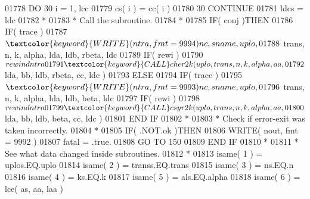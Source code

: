 \begin{DoxyCode}
01778                         \textcolor{keywordflow}{DO} 30 i = 1, lcc
01779                            cs( i ) = cc( i )
01780    30                   \textcolor{keywordflow}{CONTINUE}
01781                         ldcs = ldc
01782 \textcolor{comment}{*}
01783 \textcolor{comment}{*                       Call the subroutine.}
01784 \textcolor{comment}{*}
01785                         \textcolor{keywordflow}{IF}( conj )\textcolor{keywordflow}{THEN}
01786                            \textcolor{keywordflow}{IF}( trace )
01787      $                        \textcolor{keyword}{WRITE}( ntra, fmt = 9994 )nc, sname, uplo,
01788      $                        trans, n, k, alpha, lda, ldb, rbeta, ldc
01789                            \textcolor{keywordflow}{IF}( rewi )
01790      $                        rewind ntra
01791                            \textcolor{keyword}{CALL }cher2k( uplo, trans, n, k, alpha, aa,
01792      $                                  lda, bb, ldb, rbeta, cc, ldc )
01793                         \textcolor{keywordflow}{ELSE}
01794                            \textcolor{keywordflow}{IF}( trace )
01795      $                        \textcolor{keyword}{WRITE}( ntra, fmt = 9993 )nc, sname, uplo,
01796      $                        trans, n, k, alpha, lda, ldb, beta, ldc
01797                            \textcolor{keywordflow}{IF}( rewi )
01798      $                        rewind ntra
01799                            \textcolor{keyword}{CALL }csyr2k( uplo, trans, n, k, alpha, aa,
01800      $                                  lda, bb, ldb, beta, cc, ldc )
01801 \textcolor{keywordflow}{                        END IF}
01802 \textcolor{comment}{*}
01803 \textcolor{comment}{*                       Check if error-exit was taken incorrectly.}
01804 \textcolor{comment}{*}
01805                         \textcolor{keywordflow}{IF}( .NOT.ok )\textcolor{keywordflow}{THEN}
01806                            \textcolor{keyword}{WRITE}( nout, fmt = 9992 )
01807                            fatal = .true.
01808                            \textcolor{keywordflow}{GO TO} 150
01809 \textcolor{keywordflow}{                        END IF}
01810 \textcolor{comment}{*}
01811 \textcolor{comment}{*                       See what data changed inside subroutines.}
01812 \textcolor{comment}{*}
01813                         isame( 1 ) = uplos.EQ.uplo
01814                         isame( 2 ) = transs.EQ.trans
01815                         isame( 3 ) = ns.EQ.n
01816                         isame( 4 ) = ks.EQ.k
01817                         isame( 5 ) = als.EQ.alpha
01818                         isame( 6 ) = lce( as, aa, laa )

\end{DoxyCode}

